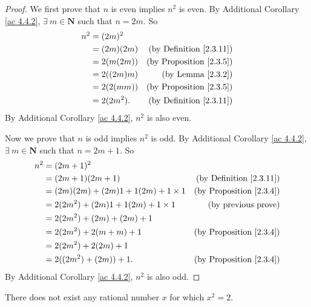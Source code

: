 \begin{proof}
    We first prove that \(n\) is even implies \(n^2\) is even.
    By Additional Corollary \ref{ac 4.4.2}, \(\exists\ m \in \mathbf{N}\) such that \(n = 2m\).
    So
    \begin{align*}
        n^2 & = (2m)^2                                         \\
            & = (2m)(2m) & \text{(by Definition \ref{2.3.11})} \\
            & = 2(m(2m)) & \text{(by Proposition \ref{2.3.5})} \\
            & = 2((2m)m) & \text{(by Lemma \ref{2.3.2})}       \\
            & = 2(2(mm)) & \text{(by Proposition \ref{2.3.5})} \\
            & = 2(2m^2). & \text{(by Definition \ref{2.3.11})}
    \end{align*}
    By Additional Corollary \ref{ac 4.4.2}, \(n^2\) is also even.

    Now we prove that \(n\) is odd implies \(n^2\) is odd.
    By Additional Corollary \ref{ac 4.4.2}, \(\exists\ m \in \mathbf{N}\) such that \(n = 2m + 1\).
    So
    \begin{align*}
        n^2 & = (2m + 1)^2                                                                  \\
            & = (2m + 1)(2m + 1)                      & \text{(by Definition \ref{2.3.11})} \\
            & = (2m)(2m) + (2m)1 + 1(2m) + 1 \times 1 & \text{(by Proposition \ref{2.3.4})} \\
            & = 2(2m^2) + (2m)1 + 1(2m) + 1 \times 1  & \text{(by previous prove)}          \\
            & = 2(2m^2) + (2m) + (2m) + 1                                                   \\
            & = 2(2m^2) + 2(m + m) + 1                & \text{(by Proposition \ref{2.3.4})} \\
            & = 2(2m^2) + 2(2m) + 1                                                         \\
            & = 2((2m^2) + (2m)) + 1.                 & \text{(by Proposition \ref{2.3.4})} \\
    \end{align*}
    By Additional Corollary \ref{ac 4.4.2}, \(n^2\) is also odd.
\end{proof}

\begin{proposition}\label{4.4.4}
    There does not exist any rational number \(x\) for which \(x^2 = 2\).
\end{proposition}

